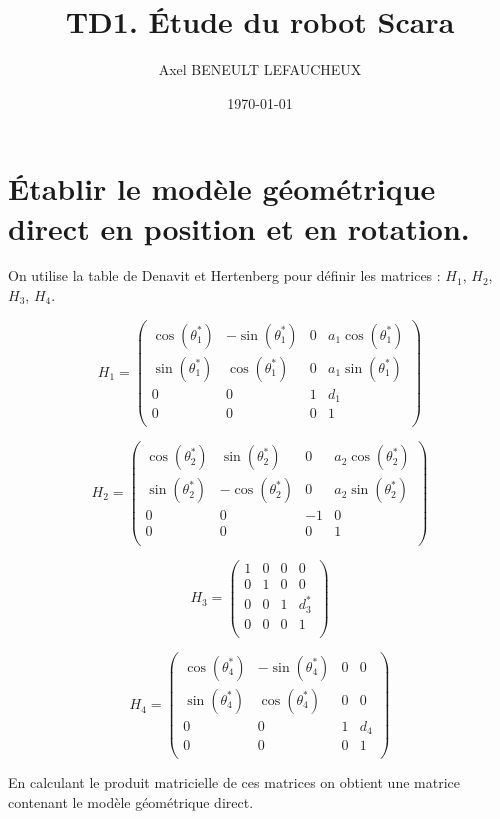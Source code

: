 \documentclass[]{article}
\title{TD1. Étude du robot Scara}
\author{Axel BENEULT LEFAUCHEUX}
\date{\today}
\begin{document}
\maketitle

\section{Établir le modèle géométrique direct en position et en
rotation.}

On utilise la table de Denavit et Hertenberg pour définir les matrices :
$H_1$, $H_2$, $H_3$, $H_4$.

\[ 
  H_1 =
  \begin{pmatrix}
     \cos (\theta^*_1) & -\sin (\theta^*_1) & 0 & a_1 \cos (\theta^*_1) \\
     \sin (\theta^*_1) & \cos (\theta^*_1) & 0 & a_1 \sin (\theta^*_1) \\
     0 & 0 & 1 & d_1 \\
     0 & 0 & 0 & 1 \\
  \end{pmatrix}
\]

\[ 
  H_2 =
  \begin{pmatrix}
    \cos (\theta^*_2) & \sin (\theta^*_2) & 0 & a_2 \cos (\theta^*_2) \\
    \sin (\theta^*_2) & -\cos (\theta^*_2) & 0 & a_2 \sin (\theta^*_2) \\
    0 & 0 & -1 & 0 \\
    0 & 0 & 0 & 1 \\
  \end{pmatrix}
\]

\[ 
  H_3 =
  \begin{pmatrix}
    1 & 0 & 0 & 0 \\
    0 & 1 & 0 & 0 \\
    0 & 0 & 1 & d^*_3 \\
    0 & 0 & 0 & 1 \\
  \end{pmatrix}
\]

\[ 
  H_4 =
  \begin{pmatrix}
    \cos (\theta^*_4) & -\sin (\theta^*_4) & 0 & 0 \\
    \sin (\theta^*_4) & \cos (\theta^*_4) & 0 & 0 \\
    0 & 0 & 1 & d_4 \\
    0 & 0 & 0 & 1 \\
  \end{pmatrix}
\]

En calculant le produit matricielle de ces matrices on obtient une
matrice contenant le modèle géométrique direct.
\end{document}
